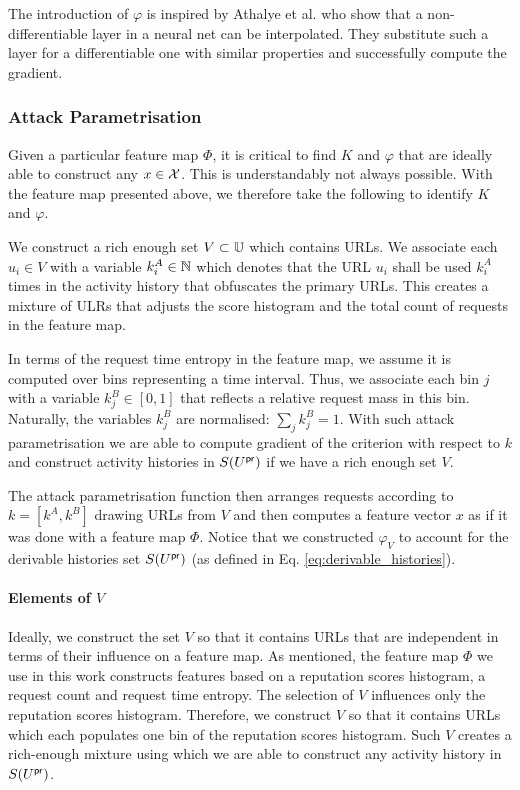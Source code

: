 The introduction of $\varphi$ is inspired by Athalye et al. \cite{obfuscated_gradients} who show that a non-differentiable layer in a neural net can be interpolated. They substitute such a layer for a differentiable one with similar properties and successfully compute the gradient.

\subsubsection{Attack Parametrisation}\label{sec:attack_parametrisation}
Given a particular feature map $\Phi$, it is critical to find $K$ and $\varphi$ that are ideally able to construct any $x \in \mathcal{X}$. This is understandably not always possible. With the feature map presented above, we therefore take the following to identify $K$ and $\varphi$.

We construct a rich enough set $V \subset \mathbb{U}$ which contains URLs. We associate each $u_i \in V$ with a variable $k^A_i \in \mathbb{N}$ which denotes that the URL $u_i$ shall be used $k^A_i$ times in the activity history that obfuscates the primary URLs. This creates a mixture of ULRs that adjusts the score histogram and the total count of requests in the feature map.

In terms of the request time entropy in the feature map, we assume it is computed over bins representing a time interval. Thus, we associate each bin $j$ with a variable $k_j^B \in [0, 1]$ that reflects a relative request mass in this bin. Naturally, the variables $k_j^B$ are normalised: $\sum_j k_j^B = 1$. With such attack parametrisation we are able to compute gradient of the criterion with respect to $k$ and construct activity histories in $S(U^{\mathsf{pr}})$ if we have a rich enough set $V$.

The attack parametrisation function then arranges requests according to $k = [k^A, k^B]$ drawing URLs from $V$ and then computes a feature vector $x$ as if it was done with a feature map $\Phi$. Notice that we constructed $\varphi_V$ to account for the derivable histories set $S(U^{\mathsf{pr}})$ (as defined in Eq. \eqref{eq:derivable_histories}).

\paragraph{Elements of $V$}
Ideally, we construct the set $V$ so that it contains URLs that are independent in terms of their influence on a feature map. As mentioned, the feature map $\Phi$ we use in this work constructs features based on a reputation scores histogram, a request count and request time entropy. The selection of $V$ influences only the reputation scores histogram. Therefore, we construct $V$ so that it contains URLs which each populates one bin of the reputation scores histogram. Such $V$ creates a rich-enough mixture using which we are able to construct any activity history in $S(U^{\mathsf{pr}})$.

